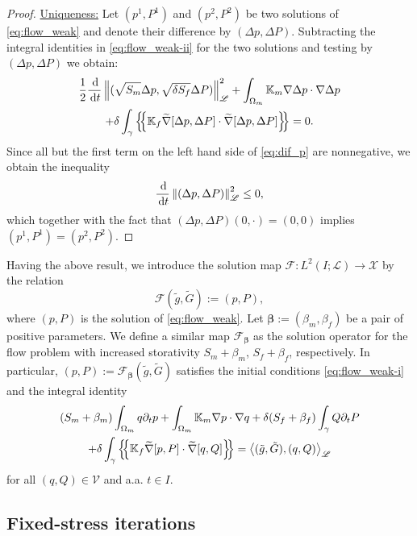\documentclass[a4paper]{article}
\numberwithin{equation}{section}
\def\agrad{\widetilde\nabla}
\def\avg#1{\left\{\mskip-5mu\left\{#1\right\}\mskip-5mu\right\}}
\def\bbeta{\boldsymbol{\beta}}
\def\d {\,{\rm d}}
\def\ddt#1{\frac{\d #1}{\d t}}
\def\dt{\prtl_t}
\def\dual#1#2{\left\langle #1,#2\right\rangle}
\def\Hf{\mathscr{L}} %
\def\norm#1{\left\|#1\right\|}
\def\prtl{\partial}
\def\tn#1{{\mathbb{#1}}}    %
\def\Vf{{\mathcal V}} %
\newcommand{\eqs}[1]{\begin{equation*}#1\end{equation*}}
\newcommand{\ml}[1]{\begin{multline}#1\end{multline}}
\begin{document}
\begin{proof}
\underline{Uniqueness:}
Let $(p^1,P^1)$ and $(p^2,P^2)$ be two solutions of \eqref{eq:flow_weak} and denote their difference by $(\Delta p,\Delta P)$.
Subtracting the integral identities in \eqref{eq:flow_weak-ii} for the two solutions and testing by $(\Delta p,\Delta P)$ we obtain:
\ml{ \label{eq:dif_p} \frac12\ddt{}\norm{(\sqrt{S_m}\Delta p,\sqrt{\delta S_f}\Delta P)}_\Hf^2
+ \int_{\Omega_m}\tn K_m\nabla\Delta p\cdot\nabla\Delta p\\
+ \delta\int_\gamma\avg{\tn K_f\agrad[\Delta p,\Delta P]\cdot\agrad[\Delta p,\Delta P]} = 0. }
Since all but the first term on the left hand side of \eqref{eq:dif_p} are nonnegative, we obtain the inequality
\eqs{ \ddt{}\norm{(\Delta p,\Delta P)}_\Hf^2 \le 0, }
which together with the fact that $(\Delta p,\Delta P)(0,\cdot) = (0,0)$ implies $(p^1,P^1)=(p^2,P^2)$.
\end{proof}
% 
Having the above result, we introduce the solution map $\mathcal F:L^2( I;\Hf)\to \mathcal X$ by the relation
\eqs{ \mathcal F(\tilde g,\tilde G) := (p,P), }
where $(p,P)$ is the solution of \eqref{eq:flow_weak}.
Let $\bbeta:=(\beta_m,\beta_f)$ be a pair of positive parameters.
We define a similar map $\mathcal F_{\bbeta}$ as the solution operator for the flow problem with increased storativity $S_m+\beta_m$, $S_f+\beta_f$, respectively.
In particular, $(p,P):=\mathcal F_{\bbeta}(\tilde g,\tilde G)$ satisfies the initial conditions 
\eqref{eq:flow_weak-i} and the integral identity
\ml{ \label{eq:flow_problem_beta} (S_m+\beta_m)\int_{\Omega_m} q\dt p + \int_{\Omega_m}\tn K_m\nabla p\cdot\nabla q + \delta (S_f+\beta_f)\int_\gamma Q\dt P\\
+ \delta\int_\gamma\avg{\tn K_f\agrad[p,P]\cdot\agrad[q,Q]}
= \dual{(\tilde g,\tilde G)}{(q,Q)}_\Hf }
for all $(q,Q)\in\Vf$ and a.a. $t\in I$.



\subsection{Fixed-stress iterations}\label{sec:iter}
\end{document}
